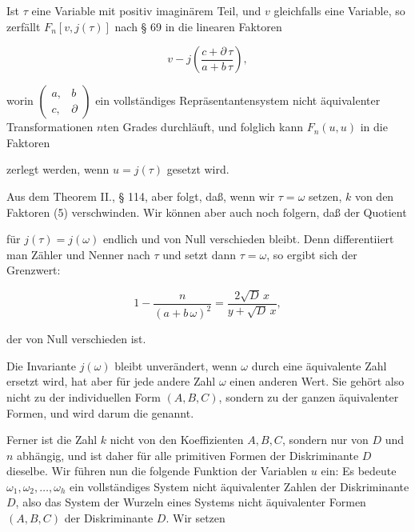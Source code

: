 Ist $\tau$ eine Variable mit positiv imaginärem Teil, und $v$ gleichfalls eine Variable, so zerfällt $F_n[v, j(\tau)]$ nach § 69 in die linearen Faktoren

\[
v - j\left(\frac{c + \partial\,\tau}{a + b\,\tau}\right),
\]

worin $\left(\begin{smallmatrix}a, & b\\ c, & \partial\end{smallmatrix}\right)$ ein vollständiges Repräsentantensystem nicht äquivalenter Transformationen $n$ten Grades durchläuft, und folglich kann $F_n(u, u)$ in die Faktoren


zerlegt werden, wenn $u = j(\tau)$ gesetzt wird.

Aus dem Theorem II., § 114, aber folgt, daß, wenn wir $\tau = \omega$ setzen, $k$ von den Faktoren (5) verschwinden. Wir können aber auch noch folgern, daß der Quotient


für $j(\tau) = j(\omega)$ endlich und von Null verschieden bleibt. Denn differentiiert man Zähler und Nenner nach $\tau$ und setzt dann $\tau = \omega$, so ergibt sich der Grenzwert:

\[
1 - \frac{n}{(a + b\,\omega)^2} = \frac{2\sqrt{D}\,x}{y + \sqrt{D}\,x},
\]

der von Null verschieden ist.

Die Invariante $j(\omega)$ bleibt unverändert, wenn $\omega$ durch eine äquivalente Zahl ersetzt wird, hat aber für jede andere Zahl $\omega$ einen anderen Wert. Sie gehört also nicht zu der individuellen Form $(A, B, C)$, sondern zu der ganzen  äquivalenter Formen, und wird darum die  genannt.

Ferner ist die Zahl $k$ nicht von den Koeffizienten $A, B, C$, sondern nur von $D$ und $n$ abhängig, und ist daher für alle primitiven Formen der Diskriminante $D$ dieselbe. Wir führen nun die folgende Funktion der Variablen $u$ ein: Es bedeute $\omega_1, \omega_2, \ldots, \omega_h$ ein vollständiges System nicht äquivalenter Zahlen der Diskriminante $D$, also das System der Wurzeln eines Systems nicht äquivalenter Formen $(A, B, C)$ der Diskriminante $D$. Wir setzen

